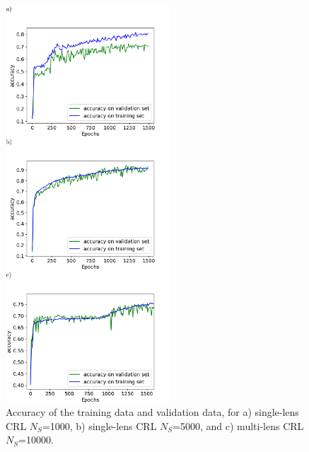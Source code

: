 \documentclass[preprint]{iucr}
\begin{document}
\begin{figure}\label{fig:v12v13}
    \includegraphics[width=0.55\textwidth]{figures/figure3.pdf}
    \caption{Accuracy of the training data and validation data, for a) single-lens CRL $N_S$=1000, b) single-lens CRL $N_S$=5000, and c) multi-lens CRL $N_S$=10000.
    }
\end{figure}



\end{document}
